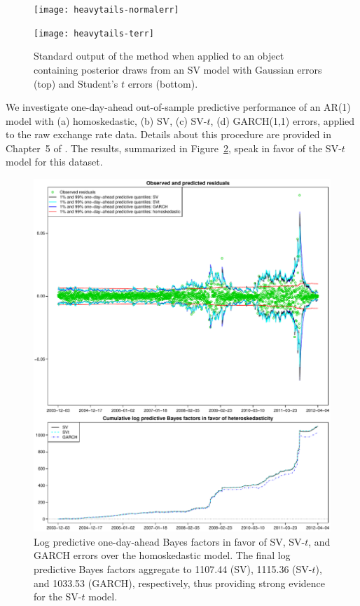 \documentclass[article, nojss]{jss}
\begin{document}
\begin{figure}[p]
\begin{center}
 \texttt{[image: heavytails-normalerr]}
 \vspace{2em}

 \texttt{[image: heavytails-terr]}
 \caption{Standard output of the  method when applied to an  object containing posterior draws from an SV model with Gaussian errors (top) and Student's $t$ errors (bottom).}
 \label{fig:res}
\end{center}
\end{figure}

We investigate one-day-ahead out-of-sample predictive performance of an AR(1) model with (a) homoskedastic, (b) SV, (c) SV-$t$, (d) GARCH(1,1) errors, applied to the raw exchange rate data. Details about this procedure are provided in Chapter~5 of \cite{kas:dea}. The results, summarized in Figure~\ref{fig2}, speak in favor of the SV-$t$ model for this dataset.

\begin{figure}[p]
\begin{center}
 \includegraphics[width=\textwidth]{predlik_terr}
 \caption{Log predictive one-day-ahead Bayes factors in favor of SV, SV-$t$, and GARCH errors over the homoskedastic model. The final log predictive Bayes factors aggregate to 1107.44 (SV), 1115.36 (SV-$t$), and 1033.53 (GARCH), respectively, thus providing strong evidence for the SV-$t$ model.}
 \label{fig2}
\end{center}
\end{figure}
\end{document}
